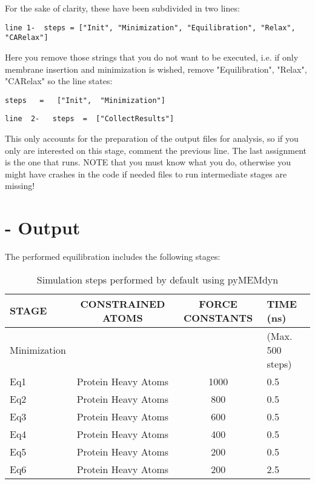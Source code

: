 \documentclass[10pt, oneside, pdftex]{article}
\begin{document}
For the  sake of clarity,  these have been  subdivided in  two lines:  

\begin{Verbatim}
line 1-  steps = ["Init", "Minimization", "Equilibration", "Relax", "CARelax"] 
\end{Verbatim}
Here you remove those strings that you do not want to be executed, i.e. if only
membrane insertion and minimization is wished, remove "Equilibration",
"Relax",   "CARelax"   so   the   line  states:   
\begin{Verbatim}
steps   =   ["Init",  "Minimization"]  
\end{Verbatim}

\begin{Verbatim}
line  2-   steps  =  ["CollectResults"]  
\end{Verbatim}

This  only accounts for the  preparation of the output files  for analysis, so if
you only are interested on  this stage, comment the previous line. The
last assignment  is the one that  runs.  NOTE that you  must know what
you do, otherwise  you might have crashes in the  code if needed files
to  run  intermediate  stages   are  missing!   

\section*{ - Output}  
The  performed equilibration includes the following stages:

\begin{table}[htbp]
\centering
\small\addtolength{\tabcolsep}{-2pt}
\begin{tabular}{p{1.6cm}|c|c|p{2.2cm}}
\hline
\textbf{STAGE} & CONSTRAINED ATOMS & FORCE CONSTANTS & TIME (ns)  \\ \hline
Minimization   &	 	   &                 & (Max. 500 steps)\\
Eq1            & Protein Heavy Atoms & 1000	     & 0.5\\
Eq2            & Protein Heavy Atoms & 800	     & 0.5\\
Eq3            & Protein Heavy Atoms & 600	     & 0.5\\
Eq4            & Protein Heavy Atoms & 400	     & 0.5\\
Eq5            & Protein Heavy Atoms & 200	     & 0.5\\
Eq6            & Protein Heavy Atoms & 200	     & 2.5\\
\end{tabular}
\parbox{5.8in}{\caption{\footnotesize{Simulation steps performed by default using pyMEMdyn}}}
\label{tab:equilibration}
\end{table}
\end{document}
